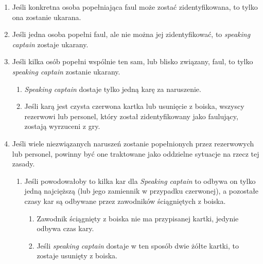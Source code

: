 \documentclass[11pt,a4paper]{article}
\renewcommand{\subsection}[1]{
  \oldsubsection{#1}%
  \label{\thesubsection}
}
\begin{document}
\begin{enumerate}

\item
  Jeśli konkretna osoba popełniająca faul może zostać zidentyfikowana,
  to tylko ona zostanie ukarana.
\item
  Jeśli jedna osoba popełni faul, ale nie można jej zidentyfikować, to
  \emph{speaking captain} zostaje ukarany.
\item
  Jeśli kilka osób popełni wspólnie ten sam, lub blisko związany, faul,
  to tylko \emph{speaking captain} zostanie ukarany.

  \begin{enumerate}
  
  \item
    \emph{Speaking captain} dostaje tylko jedną karę za naruszenie.
  \item
    Jeśli karą jest czysta czerwona kartka lub usunięcie z boiska,
    wszyscy rezerwowi lub personel, który został zidentyfikowany jako
    faulujący, zostają wyrzuceni z gry.
  \end{enumerate}
\item
  Jeśli wiele niezwiązanych naruszeń zostanie popełnionych przez
  rezerwowych lub personel, powinny być one traktowane jako oddzielne
  sytuacje na rzecz tej zasady.

  \begin{enumerate}
  
  \item
    Jeśli powodowałoby to kilka kar dla \emph{Speaking captain} to
    odbywa on tylko jedną najcięższą (lub jego zamiennik w przypadku
    czerwonej), a pozostałe czasy kar są odbywane przez zawodników
    ściągniętych z boiska.

    \begin{enumerate}
    
    \item
      Zawodnik ściągnięty z boiska nie ma przypisanej kartki, jedynie
      odbywa czas kary.
    \item
      Jeśli \emph{speaking captain} dostaje w ten sposób dwie żółte
      kartki, to zostaje usunięty z boiska.
    \end{enumerate}
  \end{enumerate}
\end{enumerate}

\subsection{Moment faulu}
\end{document}
